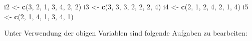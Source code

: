 \documentclass[]{article}
\newenvironment{Shaded}{\begin{snugshade}}{\end{snugshade}}
\newcommand{\KeywordTok}[1]{\textcolor[rgb]{0.13,0.29,0.53}{\textbf{#1}}}
\newcommand{\DecValTok}[1]{\textcolor[rgb]{0.00,0.00,0.81}{#1}}
\newcommand{\StringTok}[1]{\textcolor[rgb]{0.31,0.60,0.02}{#1}}
\newcommand{\NormalTok}[1]{#1}
\begin{document}
\begin{Shaded}
\begin{Highlighting}[]
\NormalTok{    i2     <-}\StringTok{ }\KeywordTok{c}\NormalTok{(}\DecValTok{3}\NormalTok{, }\DecValTok{2}\NormalTok{, }\DecValTok{1}\NormalTok{, }\DecValTok{3}\NormalTok{, }\DecValTok{4}\NormalTok{, }\DecValTok{2}\NormalTok{, }\DecValTok{2}\NormalTok{)}
\NormalTok{    i3     <-}\StringTok{ }\KeywordTok{c}\NormalTok{(}\DecValTok{3}\NormalTok{, }\DecValTok{3}\NormalTok{, }\DecValTok{3}\NormalTok{, }\DecValTok{2}\NormalTok{, }\DecValTok{2}\NormalTok{, }\DecValTok{2}\NormalTok{, }\DecValTok{4}\NormalTok{)}
\NormalTok{    i4     <-}\StringTok{ }\KeywordTok{c}\NormalTok{(}\DecValTok{2}\NormalTok{, }\DecValTok{1}\NormalTok{, }\DecValTok{2}\NormalTok{, }\DecValTok{4}\NormalTok{, }\DecValTok{2}\NormalTok{, }\DecValTok{1}\NormalTok{, }\DecValTok{4}\NormalTok{)}
\NormalTok{    i5     <-}\StringTok{ }\KeywordTok{c}\NormalTok{(}\DecValTok{2}\NormalTok{, }\DecValTok{1}\NormalTok{, }\DecValTok{4}\NormalTok{, }\DecValTok{1}\NormalTok{, }\DecValTok{3}\NormalTok{, }\DecValTok{4}\NormalTok{, }\DecValTok{1}\NormalTok{)}
\end{Highlighting}
\end{Shaded}

Unter Verwendung der obigen Variablen sind folgende Aufgaben zu
bearbeiten:
\end{document}
